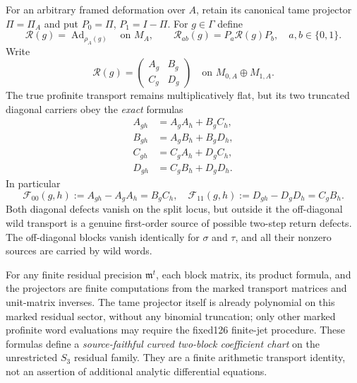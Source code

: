 \begin{theorem}
\label{thm:dyadic-f131-curved-tame-transport}
For an arbitrary framed
deformation over $A$,
retain its canonical tame
projector $\Pi=\Pi_A$
and put
$P_0=\Pi$, $P_1=I-\Pi$.
For $g\in\Gamma$ define
\[
\mathcal R(g)=\operatorname{Ad}_{\rho_A(g)}
\quad\text{on }M_A,
\qquad
\mathcal R_{ab}(g)=P_a\mathcal R(g)P_b,
\quad a,b\in\{0,1\}.
\]
Write
\begin{equation}\label{eq:dyadic-f131-curved-two-blocks}
\mathcal R(g)=
\begin{pmatrix}
A_g&B_g\\ C_g&D_g
\end{pmatrix}
\quad\text{on }M_{0,A}\oplus M_{1,A}.
\end{equation}
The true profinite
transport remains
multiplicatively flat,
but its two truncated
diagonal carriers obey
the \emph{exact} formulas
\begin{equation}\label{eq:dyadic-f131-curved-block-products}
\boxed{
\begin{aligned}
A_{gh}&=A_gA_h+B_gC_h,\\
B_{gh}&=A_gB_h+B_gD_h,\\
C_{gh}&=C_gA_h+D_gC_h,\\
D_{gh}&=C_gB_h+D_gD_h.
\end{aligned}}
\end{equation}
In particular
\begin{equation}\label{eq:dyadic-f131-two-step-return-curvature}
\boxed{\quad
\mathscr F_{00}(g,h)
:=A_{gh}-A_gA_h=B_gC_h,
\quad
\mathscr F_{11}(g,h)
:=D_{gh}-D_gD_h=C_gB_h.
\quad}
\end{equation}
Both diagonal defects
vanish on the split
locus, but outside it
the off-diagonal
wild transport is a
genuine first-order
source of possible
two-step return defects.
The off-diagonal blocks
vanish identically for
$\sigma$ and $\tau$,
and all their nonzero
sources are carried by
wild words.

For any finite residual
precision $\mathfrak m^t$,
each block matrix,
its product formula,
and the projectors
are finite computations
from the marked
transport matrices
and unit-matrix inverses.
The tame projector itself
is already polynomial
on this marked residual
sector, without any
binomial truncation;
only other marked
profinite word evaluations
may require the fixed126
finite-jet procedure.
These formulas define
a \emph{source-faithful
curved two-block
coefficient chart} on
the unrestricted
$S_3$ residual family.
They are a
finite arithmetic
transport identity,
not an assertion of
additional analytic
differential equations.
\end{theorem}

